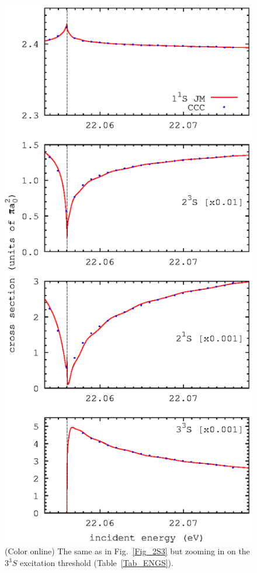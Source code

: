 \documentclass[aip
, pra
, showpacs
, aps
, twocolumn
, groupedaddress
, floatfix
]{revtex4}
\begin{document}
\begin{figure}[htb]
\includegraphics[scale=1]{fig_res_3S3.ps}
\caption{(Color online) The same as in Fig.~\ref{Fig_2S3}
but zooming in on the $3^3S$ excitation threshold (Table~\ref{Tab_ENGS}).
}
\label{Fig_3S3}
\end{figure}
\end{document}
